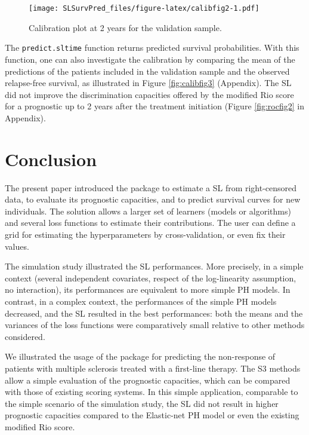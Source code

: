 \begin{figure}
\centering
\texttt{[image: SLSurvPred\_files/figure-latex/calibfig2-1.pdf]}
\caption{\label{fig:calibfig2}Calibration plot at 2 years for the validation sample.}
\end{figure}

The \texttt{predict.sltime} function returns predicted survival probabilities. With this function, one can also investigate the calibration by comparing the mean of the predictions of the patients included in the validation sample and the observed relapse-free survival, as illustrated in Figure \ref{fig:calibfig3} (Appendix). The SL did not improve the discrimination capacities offered by the modified Rio score for a prognostic up to 2 years after the treatment initiation (Figure \ref{fig:rocfig2} in Appendix).

\hypertarget{conclusion}{%
\section{Conclusion}\label{conclusion}}

The present paper introduced the  package to estimate a SL from right-censored data, to evaluate its prognostic capacities, and to predict survival curves for new individuals. The solution allows a larger set of learners (models or algorithms) and several loss functions to estimate their contributions. The user can define a grid for estimating the hyperparameters by cross-validation, or even fix their values.

The simulation study illustrated the SL performances. More precisely, in a simple context (several independent covariates, respect of the log-linearity assumption, no interaction), its performances are equivalent to more simple PH models. In contrast, in a complex context, the performances of the simple PH models decreased, and the SL resulted in the best performances: both the means and the variances of the loss functions were comparatively small relative to other methods considered.

We illustrated the usage of the package for predicting the non-response of patients with multiple sclerosis treated with a first-line therapy. The S3 methods allow a simple evaluation of the prognostic capacities, which can be compared with those of existing scoring systems. In this simple application, comparable to the simple scenario of the simulation study, the SL did not result in higher prognostic capacities compared to the Elastic-net PH model or even the existing modified Rio score.

